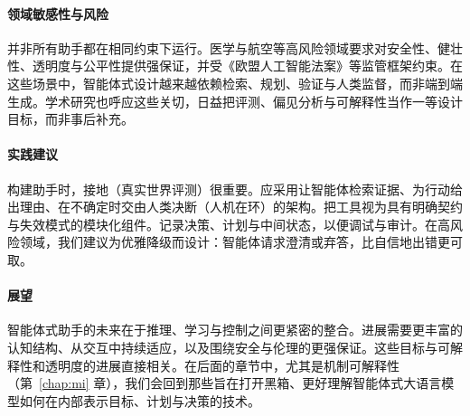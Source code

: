 \paragraph{领域敏感性与风险}
并非所有助手都在相同约束下运行。医学与航空等高风险领域要求对安全性、健壮性、透明度与公平性提供强保证，并受《欧盟人工智能法案》等监管框架约束。在这些场景中，智能体式设计越来越依赖检索、规划、验证与人类监督，而非端到端生成。学术研究也呼应这些关切，日益把评测、偏见分析与可解释性当作一等设计目标，而非事后补充。

\paragraph{实践建议}
构建助手时，接地（真实世界评测）很重要。应采用让智能体检索证据、为行动给出理由、在不确定时交由人类决断（人机在环）的架构。把工具视为具有明确契约与失效模式的模块化组件。记录决策、计划与中间状态，以便调试与审计。在高风险领域，我们建议为优雅降级而设计：智能体请求澄清或弃答，比自信地出错更可取。

\paragraph{展望}
智能体式助手的未来在于推理、学习与控制之间更紧密的整合。进展需要更丰富的认知结构、从交互中持续适应，以及围绕安全与伦理的更强保证。这些目标与可解释性和透明度的进展直接相关。在后面的章节中，尤其是机制可解释性（第~\ref{chap:mi} 章），我们会回到那些旨在打开黑箱、更好理解智能体式大语言模型如何在内部表示目标、计划与决策的技术。








